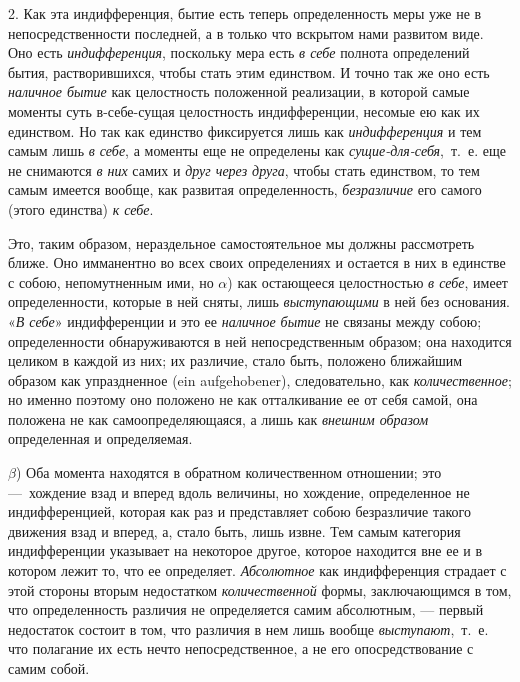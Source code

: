 2. Как эта индифференция, бытие есть теперь определенность меры уже не в
непосредственности последней, а в только что вскрытом нами развитом виде.
Оно есть {\em индифференция}, поскольку мера есть
{\em в себе} полнота определений бытия, растворившихся,
чтобы стать этим единством. И точно так же оно есть
{\em наличное бытие} как целостность положенной
реализации, в которой самые моменты суть в-себе-сущая целостность
индифференции, несомые ею как их единством. Но так как единство фиксируется
лишь как {\em индифференция} и тем самым лишь
{\em в себе}, а моменты еще не определены как
{\em сущие-для-себя},~т.~е. еще не снимаются
{\em в них} самих и {\em друг через
друга}, чтобы стать единством, то тем самым имеется вообще, как развитая
определенность, {\em безразличие} его самого (этого
единства) {\em к себе}.

Это, таким образом, нераздельное самостоятельное мы должны рассмотреть
ближе. Оно имманентно во всех своих определениях и остается в них в
единстве с собою, непомутненным ими, но $\alpha$)
как остающееся целостностью {\em в себе}, имеет
определенности, которые в ней сняты, лишь
{\em выступающими} в ней без основания.
«{\em В себе}» индифференции и это ее
{\em наличное бытие} не связаны между собою;
определенности обнаруживаются в ней непосредственным образом; она находится
целиком в каждой из них; их различие, стало быть, положено ближайшим
образом как упраздненное (ein aufgehobener), следовательно, как
{\em количественное}; но именно поэтому оно положено не
как отталкивание ее от себя самой, она положена не как самоопределяющаяся,
а лишь как {\em внешним образом} определенная и
определяемая.

$\beta $) Оба момента находятся в обратном
количественном отношении; это —~хождение взад и вперед вдоль величины, но
хождение, определенное не индифференцией, которая как раз и представляет
собою безразличие такого движения взад и вперед, а, стало быть, лишь извне.
Тем самым категория индифференции указывает на некоторое другое, которое
находится вне ее и в котором лежит то, что ее определяет.
{\em Абсолютное} как индифференция страдает с этой
стороны вторым недостатком {\em количественной} формы,
заключающимся в том, что определенность различия не определяется самим
абсолютным, — первый недостаток состоит в том, что различия в нем лишь
вообще {\em выступают},~т.~е. что полагание их есть
нечто непосредственное, а не его опосредствование с самим собой.

